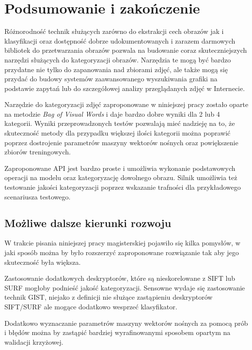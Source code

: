 \chapter{Podsumowanie i zakończenie}

Różnorodność technik służących zarówno do ekstrakcji cech obrazów jak i klasyfikacji oraz dostępność dobrze udokumentowanych i zarazem darmowych bibliotek do przetwarzania obrazów pozwala na budowanie coraz skuteczniejszych narzędzi służących do kategoryzacji obrazów. Narzędzia te mogą być bardzo przydatne nie tylko do zapanowania nad zbiorami zdjęć, ale także mogą się przydać do budowy systemów zaawansowanego wyszukiwania grafiki na podstawie zapytań lub do szczegółowej analizy przeglądanych zdjęć w Internecie.

Narzędzie do kategoryzacji zdjęć zaproponowane w niniejszej pracy zostało oparte na metodzie \emph{Bag of Visual Words} i daje bardzo dobre wyniki dla 2 lub 4 kategorii. Wyniki przeprowadzonych testów pozwalają mieć nadzieję na to, że skuteczność metody dla przypadku większej ilości kategorii można poprawić poprzez dostrojenie parametrów maszyny wektorów nośnych oraz powiększenie zbiorów treningowych.

Zaproponowane API jest bardzo proste i umożliwia wykonanie podstawowych operacji na modelu oraz kategoryzację dowolnego obrazu. Silnik umożliwia też testowanie jakości kategoryzacji poprzez wskazanie trafności dla przykładowego scenariusza testowego. 

\section{Możliwe dalsze kierunki rozwoju}

W trakcie pisania niniejszej pracy magisterskiej pojawiło się kilka pomysłów, w jaki sposób można by było rozszerzyć zaproponowane rozwiązanie tak aby jego skuteczność była większa.

Zastosowanie dodatkowych deskryptorów, które są nieskorelowane z SIFT lub SURF mogłoby podnieść jakość kategoryzacji. Sensowne wydaje się zastosowanie technik GIST, niejako z definicji nie służące zastąpieniu deskryptorów SIFT/SURF ale mogące dodatkowo wesprzeć klasyfikator.

Dodatkowo wyznaczanie parametrów maszyny wektorów nośnych za pomocą prób i błędów można by zastąpić bardziej wyrafinowanymi sposobem opartym na walidacji krzyżowej.